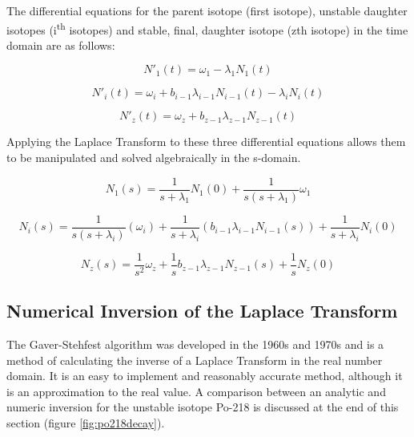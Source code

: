 \documentclass[12pt,twoside]{manual}
\begin{document}
The differential equations for the parent isotope (first isotope), unstable daughter isotopes (i\textsuperscript{th} isotopes) and stable, final, daughter isotope (zth isotope) in the time domain are as follows:

\begin{equation}
N'_{1}(t) = \omega_{1} - \lambda_{1} N_{1} (t)
\end{equation}

\begin{equation}
N'_{i}(t) = \omega_{i} + b_{i-1} \lambda_{i-1} N_{i-1} (t) - \lambda_{i} N_{i} (t)
\end{equation}

\begin{equation}
N'_{z}(t) =  \omega_{z} + b_{z-1} \lambda_{z-1} N_{z-1} (t)
\end{equation}

Applying the Laplace Transform to these three differential equations allows them to be manipulated and solved algebraically in the s-domain.

\begin{equation}
N_{1}(s) = \frac{1}{s+\lambda_{1}} N_{1}(0) + \frac{1}{s(s+\lambda_{1})} \omega_{1}
\end{equation}

\begin{equation}
N_{i}(s) = \frac{1}{s ( s+ \lambda_{i})} \left(\omega_{i} \right) + \frac{1}{s+ \lambda_{i}} \left( b_{i-1} \lambda_{i-1} N_{i-1} (s) \right) + \frac{1}{s+ \lambda_{i}} N_{i} (0)
\end{equation}

\begin{equation}
N_{z}(s) = \frac{1}{s^2} \omega_{z} + \frac{1}{s} b_{z-1} \lambda_{z-1} N_{z-1} (s) + \frac{1}{s} N_{z}(0)
\end{equation}


\subsection{Numerical Inversion of the Laplace Transform}

The Gaver-Stehfest\cite{stehfest} algorithm was developed in the 1960s and 1970s and is a method of calculating the inverse of a Laplace Transform in the real number domain.  It is an easy to implement and reasonably accurate method, although it is an approximation to the real value.  A comparison between an analytic and numeric inversion for the unstable isotope Po-218 is discussed at the end of this section (figure \ref{fig:po218decay}).
\end{document}
